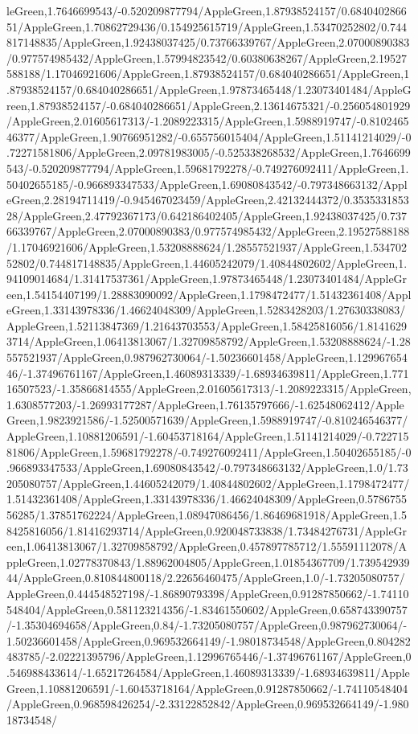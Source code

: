 {\begin{tikzternal}
leGreen,1.7646699543/-0.520209877794/AppleGreen,1.87938524157/0.684040286651/AppleGreen,1.70862729436/0.154925615719/AppleGreen,1.53470252802/0.744817148835/AppleGreen,1.92438037425/0.73766339767/AppleGreen,2.07000890383/0.977574985432/AppleGreen,1.57994823542/0.60380638267/AppleGreen,2.19527588188/1.17046921606/AppleGreen,1.87938524157/0.684040286651/AppleGreen,1.87938524157/0.684040286651/AppleGreen,1.97873465448/1.23073401484/AppleGreen,1.87938524157/-0.684040286651/AppleGreen,2.13614675321/-0.256054801929/AppleGreen,2.01605617313/-1.2089223315/AppleGreen,1.5988919747/-0.810246546377/AppleGreen,1.90766951282/-0.655756015404/AppleGreen,1.51141214029/-0.72271581806/AppleGreen,2.09781983005/-0.525338268532/AppleGreen,1.7646699543/-0.520209877794/AppleGreen,1.59681792278/-0.749276092411/AppleGreen,1.50402655185/-0.966893347533/AppleGreen,1.69080843542/-0.797348663132/AppleGreen,2.28194711419/-0.945467023459/AppleGreen,2.42132444372/0.353533185328/AppleGreen,2.47792367173/0.642186402405/AppleGreen,1.92438037425/0.73766339767/AppleGreen,2.07000890383/0.977574985432/AppleGreen,2.19527588188/1.17046921606/AppleGreen,1.53208888624/1.28557521937/AppleGreen,1.53470252802/0.744817148835/AppleGreen,1.44605242079/1.40844802602/AppleGreen,1.94109014684/1.31417537361/AppleGreen,1.97873465448/1.23073401484/AppleGreen,1.54154407199/1.28883090092/AppleGreen,1.1798472477/1.51432361408/AppleGreen,1.33143978336/1.46624048309/AppleGreen,1.5283428203/1.27630338083/AppleGreen,1.52113847369/1.21643703553/AppleGreen,1.58425816056/1.81416293714/AppleGreen,1.06413813067/1.32709858792/AppleGreen,1.53208888624/-1.28557521937/AppleGreen,0.987962730064/-1.50236601458/AppleGreen,1.12996765446/-1.37496761167/AppleGreen,1.46089313339/-1.68934639811/AppleGreen,1.77116507523/-1.35866814555/AppleGreen,2.01605617313/-1.2089223315/AppleGreen,1.6308577203/-1.26993177287/AppleGreen,1.76135797666/-1.62548062412/AppleGreen,1.9823921586/-1.52500571639/AppleGreen,1.5988919747/-0.810246546377/AppleGreen,1.10881206591/-1.60453718164/AppleGreen,1.51141214029/-0.72271581806/AppleGreen,1.59681792278/-0.749276092411/AppleGreen,1.50402655185/-0.966893347533/AppleGreen,1.69080843542/-0.797348663132/AppleGreen,1.0/1.73205080757/AppleGreen,1.44605242079/1.40844802602/AppleGreen,1.1798472477/1.51432361408/AppleGreen,1.33143978336/1.46624048309/AppleGreen,0.578675556285/1.37851762224/AppleGreen,1.08947086456/1.86469681918/AppleGreen,1.58425816056/1.81416293714/AppleGreen,0.920048733838/1.73484276731/AppleGreen,1.06413813067/1.32709858792/AppleGreen,0.457897785712/1.55591112078/AppleGreen,1.02778370843/1.88962004805/AppleGreen,1.01854367709/1.73954293944/AppleGreen,0.810844800118/2.22656460475/AppleGreen,1.0/-1.73205080757/AppleGreen,0.444548527198/-1.86890793398/AppleGreen,0.91287850662/-1.74110548404/AppleGreen,0.581123214356/-1.83461550602/AppleGreen,0.658743390757/-1.35304694658/AppleGreen,0.84/-1.73205080757/AppleGreen,0.987962730064/-1.50236601458/AppleGreen,0.969532664149/-1.98018734548/AppleGreen,0.804282483785/-2.02221395796/AppleGreen,1.12996765446/-1.37496761167/AppleGreen,0.546988433614/-1.65217264584/AppleGreen,1.46089313339/-1.68934639811/AppleGreen,1.10881206591/-1.60453718164/AppleGreen,0.91287850662/-1.74110548404/AppleGreen,0.968598426254/-2.33122852842/AppleGreen,0.969532664149/-1.98018734548/
\end{tikzternal}}
